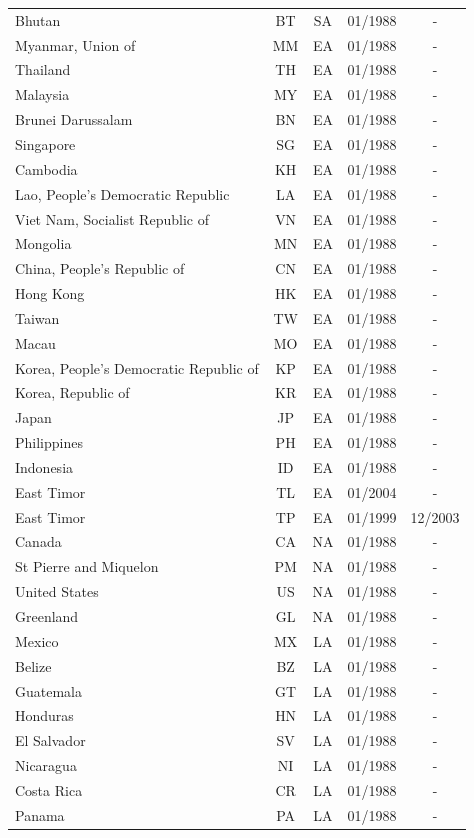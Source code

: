 \begin{small}
\begin{longtable}{p{7.5cm}cccc}
Bhutan	&	BT	&	SA	&	01/1988	&	-	\\
Myanmar, Union of	&	MM	&	EA	&	01/1988	&	-	\\
Thailand	&	TH	&	EA	&	01/1988	&	-	\\
Malaysia	&	MY	&	EA	&	01/1988	&	-	\\
Brunei Darussalam	&	BN	&	EA	&	01/1988	&	-	\\
Singapore	&	SG	&	EA	&	01/1988	&	-	\\
Cambodia	&	KH	&	EA	&	01/1988	&	-	\\
Lao, People's Democratic Republic	&	LA	&	EA	&	01/1988	&	-	\\
Viet Nam, Socialist Republic of	&	VN	&	EA	&	01/1988	&	-	\\
Mongolia	&	MN	&	EA	&	01/1988	&	-	\\
China, People's Republic of	&	CN	&	EA	&	01/1988	&	-	\\
Hong Kong	&	HK	&	EA	&	01/1988	&	-	\\
Taiwan	&	TW	&	EA	&	01/1988	&	-	\\
Macau	&	MO	&	EA	&	01/1988	&	-	\\
Korea, People's Democratic Republic of	&	KP	&	EA	&	01/1988	&	-	\\
Korea, Republic of	&	KR	&	EA	&	01/1988	&	-	\\
Japan	&	JP	&	EA	&	01/1988	&	-	\\
Philippines	&	PH	&	EA	&	01/1988	&	-	\\
Indonesia	&	ID	&	EA	&	01/1988	&	-	\\
East Timor	&	TL	&	EA	&	01/2004	&	-	\\
East Timor	&	TP	&	EA	&	01/1999	&	12/2003	\\
Canada	&	CA	&	NA	&	01/1988	&	-	\\
St Pierre and Miquelon	&	PM	&	NA	&	01/1988	&	-	\\
United States	&	US	&	NA	&	01/1988	&	-	\\
Greenland	&	GL	&	NA	&	01/1988	&	-	\\
Mexico	&	MX	&	LA	&	01/1988	&	-	\\
Belize	&	BZ	&	LA	&	01/1988	&	-	\\
Guatemala	&	GT	&	LA	&	01/1988	&	-	\\
Honduras	&	HN	&	LA	&	01/1988	&	-	\\
El Salvador	&	SV	&	LA	&	01/1988	&	-	\\
Nicaragua	&	NI	&	LA	&	01/1988	&	-	\\
Costa Rica	&	CR	&	LA	&	01/1988	&	-	\\
Panama	&	PA	&	LA	&	01/1988	&	-	\\

\end{longtable}
\end{small}

